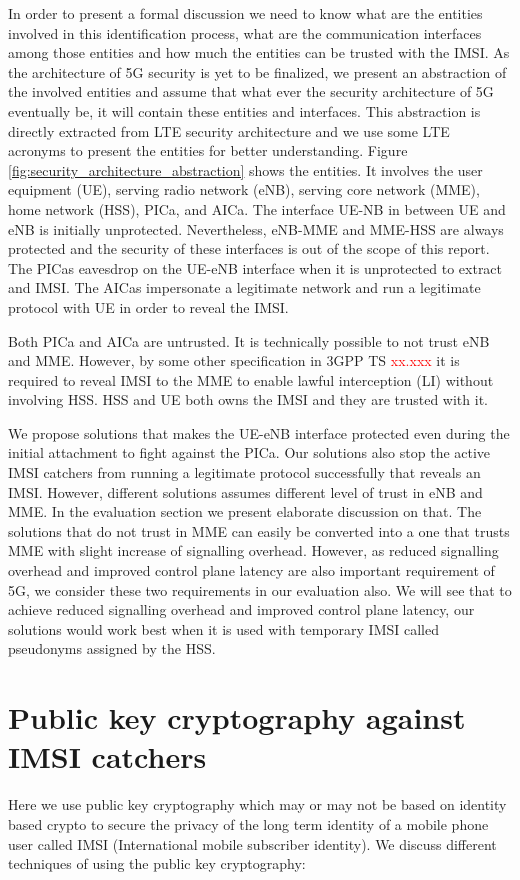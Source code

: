 \documentclass[lnicst,sechang,a4paper]{svmultln}
\begin{document}
In order to present a formal discussion we need to know what are the entities involved in this identification process, what are the communication interfaces among those entities and how much the entities can be trusted with the IMSI.  As the architecture of 5G security is yet to be finalized, we present an abstraction of the involved entities and assume that what ever the security architecture of 5G eventually be, it will contain these entities and interfaces. This abstraction is directly extracted from LTE security architecture and we use some LTE acronyms to present the entities for better understanding. Figure \textcolor{red}{\ref{fig:security_architecture_abstraction}} shows the entities. It involves the user equipment (UE), serving radio network (eNB), serving core network (MME), home network (HSS), PICa, and AICa. The interface  UE-NB in between UE and eNB is initially unprotected. Nevertheless, eNB-MME and MME-HSS are always protected and the security of these interfaces is out of the scope of this report. The PICas eavesdrop on the UE-eNB interface when it is unprotected to extract and IMSI. The AICas impersonate a legitimate network and run a legitimate protocol with UE in order to reveal the IMSI. 

Both PICa and AICa are untrusted. It is technically possible to not trust eNB and MME. However, by some other specification in 3GPP TS \textcolor{red}{xx.xxx} it is required to reveal IMSI to the MME to enable lawful interception (LI) without involving HSS. HSS and UE both owns the IMSI and they are trusted with it.

We propose solutions that makes the UE-eNB interface protected even during the initial attachment to fight against the PICa. Our solutions also stop the active IMSI catchers from running a legitimate protocol successfully that reveals an IMSI. However, different solutions assumes different level of trust in eNB and MME. In the evaluation section we present elaborate discussion on that. The solutions that do not trust in MME can easily be converted into a one that trusts MME with slight increase of signalling overhead. However, as reduced signalling overhead and improved control plane latency are also important requirement of 5G, we consider these two requirements in our evaluation also. We will see that to achieve reduced signalling overhead and improved control plane latency, our solutions would work best when it is used with temporary IMSI called pseudonyms assigned by the HSS.

\section{Public key cryptography against IMSI catchers}
Here we use public key cryptography which may or may not be based on identity based crypto to secure the privacy of the long term identity of a mobile phone user called IMSI (International mobile subscriber identity). We discuss different techniques of using the public key cryptography:
\end{document}
